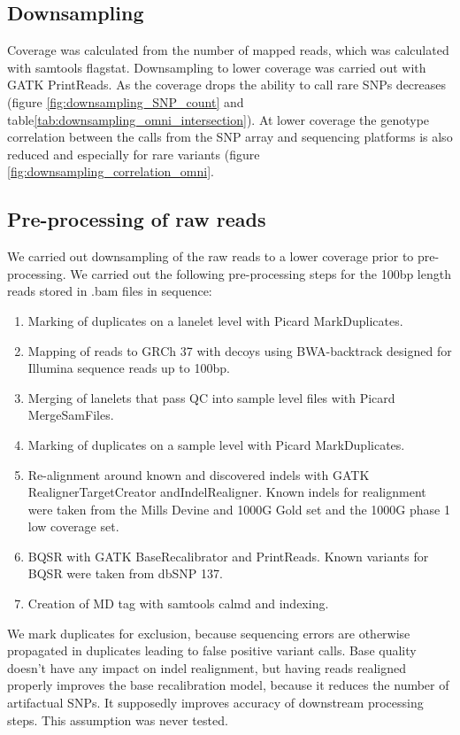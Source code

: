 \subsection{Downsampling}
Coverage was calculated from the number of mapped reads, which was calculated with samtools\cite{Li15082009} flagstat. Downsampling to lower coverage was carried out with \gls{GATK} PrintReads.\cite{DePristo2011} As the coverage drops the ability to call rare \glspl{SNP} decreases (figure \ref{fig:downsampling_SNP_count} and table\ref{tab:downsampling_omni_intersection}). At lower coverage the genotype correlation between the calls from the SNP array and sequencing platforms is also reduced and especially for rare variants (figure \ref{fig:downsampling_correlation_omni}.

\subsection{Pre-processing of raw reads}
We carried out downsampling of the raw reads to a lower coverage prior to pre-processing. We carried out the following pre-processing steps for the 100bp length reads stored in .bam files in sequence:
\begin{enumerate}
\item Marking of duplicates on a lanelet level with Picard MarkDuplicates.
\item Mapping of reads to \gls{GRCh} 37 with decoys using BWA-backtrack\cite{Li15072009} designed for Illumina sequence reads up to 100bp.
\item Merging of lanelets that pass \gls{QC} into sample level files with Picard MergeSamFiles.
\item Marking of duplicates on a sample level with Picard MarkDuplicates.
\item Re-alignment around known and discovered indels with GATK RealignerTargetCreator andIndelRealigner. Known indels for realignment were taken from the Mills Devine and 1000G Gold set and the 1000G phase 1 low coverage set.
\item \gls{BQSR} with GATK BaseRecalibrator and PrintReads. Known variants for BQSR were taken from dbSNP 137.
\item Creation of MD tag with samtools calmd and indexing.
\end{enumerate}

We mark duplicates for exclusion, because sequencing errors are otherwise propagated in duplicates leading to false positive variant calls. Base quality doesn't have any impact on indel realignment, but having reads realigned properly improves the base recalibration model, because it reduces the number of artifactual SNPs. It supposedly improves accuracy of downstream processing steps. This assumption was never tested.

